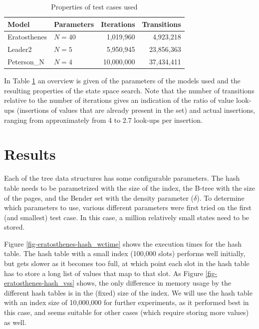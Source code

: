 \documentclass{acm_proc_article-sp}
\begin{document}
\begin{table}
\begin{center}
\begin{tabular}{ l l r r }
\hline
\textbf{Model} & \textbf{Parameters} & \textbf{Iterations} & \textbf{Transitions} \\
\hline
Eratosthenes & $N=40$ &  1,019,960 &  4,923,218 \\
Leader2      & $N=5$  &  5,950,945 & 23,856,363 \\
Peterson\_N  & $N=4$  & 10,000,000 & 37,434,411 \\
\hline
\end{tabular}
\caption{Properties of test cases used}
\label{tab-cases}
\end{center}
\end{table}


In Table \ref{tab-cases} an overview is given of the parameters of the models used
and the resulting properties of the state space search.
Note that the number of transitions relative to the number of iterations gives an
indication of the ratio of value look-ups (insertions of values that are already
present in the set) and actual insertions, ranging from approximately from 4 to
2.7 look-ups per insertion.


\section{Results}
Each of the tree data structures has some configurable parameters. The hash table
needs to be parametrized with the size of the index, the B-tree with the size of
the pages, and the Bender set with the density parameter ($\delta$). To determine
which parameters to use, various different parameters were first tried on the
first (and smallest) test case. In this case, a million relatively small states
need to be stored.

Figure \ref{fig-eratosthenes-hash_wctime} shows the execution times for the hash
table.
The hash table
with a small index (100,000 slots) performs well initially, but gets slower as
it becomes too full, at which point each slot in the hash table has to store a
long list of values that map to that slot.
As Figure \ref{fig-eratosthenes-hash_vss} shows, the only difference in memory
usage by the different hash tables is in the (fixed) size of the index.
We will use the hash table with an index size of 10,000,000 for further
experiments, as it performed best in this case, and seems suitable for other
cases (which require storing more values) as well.
\end{document}
